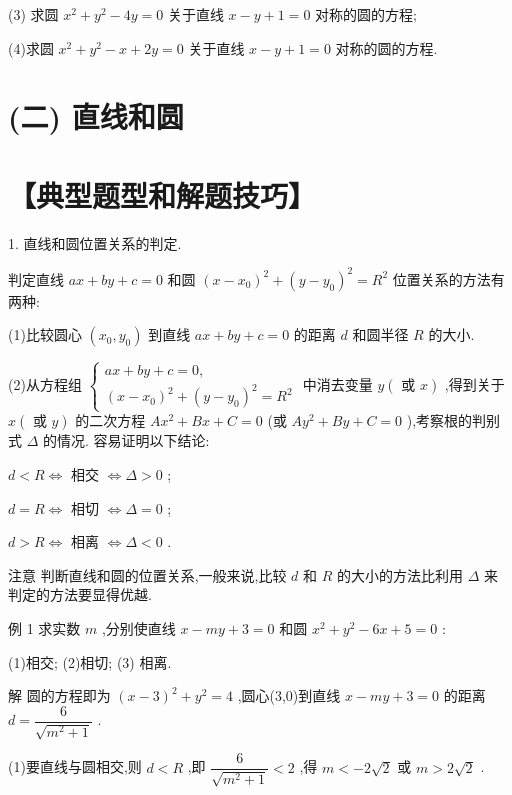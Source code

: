 (3) 求圆 ${x}^{2} + {y}^{2} - {4y} = 0$ 关于直线 $x - y + 1 = 0$ 对称的圆的方程;

(4)求圆 ${x}^{2} + {y}^{2} - x + {2y} = 0$ 关于直线 $x - y + 1 = 0$ 对称的圆的方程.

\section*{(二) 直线和圆}

\section*{【典型题型和解题技巧】}

1. 直线和圆位置关系的判定.

判定直线 ${ax} + {by} + c = 0$ 和圆 ${\left( x - {x}_{0}\right) }^{2} + {\left( y - {y}_{0}\right) }^{2} = {R}^{2}$ 位置关系的方法有两种:

(1)比较圆心 $\left( {{x}_{0},{y}_{0}}\right)$ 到直线 ${ax} + {by} + c = 0$ 的距离 $d$ 和圆半径 $R$ 的大小.

(2)从方程组 $\left\{  \begin{array}{l} {ax} + {by} + c = 0, \\  {\left( x - {x}_{0}\right) }^{2} + {\left( y - {y}_{0}\right) }^{2} = {R}^{2} \end{array}\right.$ 中消去变量 $y\left( {\text{ 或 }x}\right)$ ,得到关于 $x\left( {\text{ 或 }y}\right)$ 的二次方程 $A{x}^{2} + {Bx} + C = 0$ (或 $A{y}^{2} + {By} + C = 0$ ),考察根的判别式 $\Delta$ 的情况. 容易证明以下结论:

$d < R \Leftrightarrow$ 相交 $\Leftrightarrow  \Delta  > 0$ ;

$d = R \Leftrightarrow$ 相切 $\Leftrightarrow  \Delta  = 0$ ;

$d > R \Leftrightarrow$ 相离 $\Leftrightarrow  \Delta  < 0$ .

注意 判断直线和圆的位置关系,一般来说,比较 $d$ 和 $R$ 的大小的方法比利用 $\Delta$ 来判定的方法要显得优越.

例 1 求实数 $m$ ,分别使直线 $x - {my} + 3 = 0$ 和圆 ${x}^{2} + {y}^{2} - {6x} + 5 = 0$ :

(1)相交; (2)相切; (3) 相离.

解 圆的方程即为 ${\left( x - 3\right) }^{2} + {y}^{2} = 4$ ,圆心(3,0)到直线 $x - {my} + 3 = 0$ 的距离 $d = \dfrac{6}{\sqrt{{m}^{2} + 1}}$ .

(1)要直线与圆相交,则 $d < R$ ,即 $\dfrac{6}{\sqrt{{m}^{2} + 1}} < 2$ ,得 $m <  - 2\sqrt{2}$ 或 $m > 2\sqrt{2}$ .

